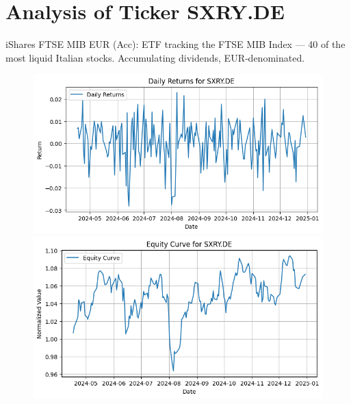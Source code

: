 \documentclass{article}%
\begin{document}
%
\newpage

%
\section*{Analysis of Ticker SXRY.DE}%
\label{sec:AnalysisofTickerSXRY.DE}%
iShares FTSE MIB EUR (Acc): ETF tracking the FTSE MIB Index — 40 of the most liquid Italian stocks. Accumulating dividends, EUR‑denominated.%


\begin{figure}[htbp]%
\begin{minipage}{0.49\textwidth}%
\includegraphics[width=\linewidth]{ticker_images/SXRY.DE_daily_returns.png}%
\end{minipage}%
\begin{minipage}{0.49\textwidth}%
\includegraphics[width=\linewidth]{ticker_images/SXRY.DE_equity_curve.png}%
\end{minipage}%
\end{figure}

%
\end{document}
